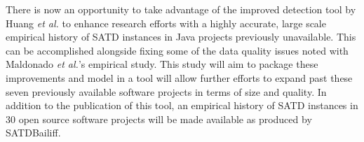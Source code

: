 \documentclass[3p]{elsarticle}
\newcommand{\approach}{SATDBailiff\xspace}
\begin{document}
There is now an opportunity to take advantage of the improved detection tool by Huang \textit{et al.} \cite{Huang} to enhance research efforts with a highly accurate, large scale empirical history of SATD instances in Java projects previously unavailable. This can be accomplished alongside fixing some of the data quality issues noted with Maldonado \textit{et al.}'s \cite{Maldonado2017-2} empirical study. This study will aim to package these improvements and model in a tool will allow further efforts to expand past these seven previously available software projects in terms of size and quality. In addition to the publication of this tool, an empirical history
of SATD instances in 30 open source software projects will be made available as produced by  \approach.


\end{document}
